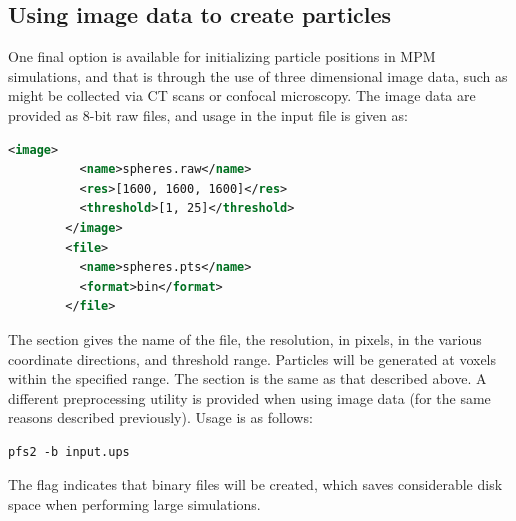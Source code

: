 \subsection{Using image data to create particles}
One final option is available for initializing particle positions in MPM
simulations, and that is through the use of three dimensional image data,
such as might be collected via CT scans or confocal microscopy.  The image data are 
provided as 8-bit raw files, and usage in the input file is given as:
\begin{lstlisting}[language=XML]
        <image>
          <name>spheres.raw</name>
          <res>[1600, 1600, 1600]</res>
          <threshold>[1, 25]</threshold>
        </image>
        <file>
          <name>spheres.pts</name>
          <format>bin</format>
        </file>
\end{lstlisting}
The  section gives the name of the file, the resolution, in pixels,
in the various coordinate directions, and threshold range.  Particles will be
generated at voxels within the specified range.  The 
section is the same as that described above.  A different preprocessing utility
is provided when using image data (for the same reasons described previously).
Usage is as follows:
\begin{lstlisting}[backgroundcolor=\color{background}]
   pfs2 -b input.ups
\end{lstlisting}
The  flag indicates that binary  files will be created, which
saves considerable disk space when performing large simulations.

